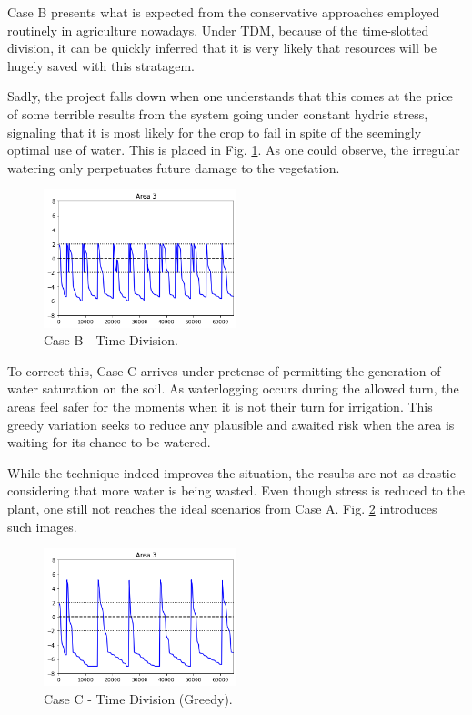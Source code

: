 \documentclass[12pt]{article}
\begin{document}
Case B presents what is expected from the conservative approaches employed routinely in agriculture nowadays.  Under TDM, because of the time-slotted division, it can be quickly inferred that it is very likely that resources will be hugely saved with this stratagem. 

Sadly, the project falls down when one understands that this comes at the price of some terrible results from the system going under constant hydric stress, signaling that it is most likely for the crop to fail in spite of the seemingly optimal use of water. This is placed in Fig. \ref{fig:case_b}. As one could observe, the irregular watering only perpetuates future damage to the vegetation.

\begin{figure}[ht]
\includegraphics[width=0.5\textwidth]{case_b}
\centering
\caption{Case B - Time Division.}
\label{fig:case_b}
\end{figure}

To correct this, Case C arrives under pretense of permitting the generation of water saturation on the soil. As waterlogging occurs during the allowed turn, the areas feel safer for the moments when it is not their turn for irrigation. This greedy variation seeks to reduce any plausible and awaited risk when the area is waiting for its chance to be watered. 

While the technique indeed improves the situation, the results are not as drastic considering that more water is being wasted. Even though stress is reduced to the plant, one still not reaches the ideal scenarios from Case A. Fig. \ref{fig:case_c} introduces such images.

\begin{figure}[ht]
\includegraphics[width=0.5\textwidth]{case_c}
\centering
\caption{Case C - Time Division (Greedy).}
\label{fig:case_c}
\end{figure}
\end{document}
